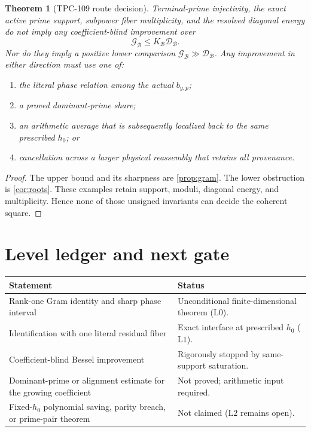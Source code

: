 \documentclass[11pt,a4paper]{article}
\newtheorem{theorem}{Theorem}[section]
\theoremstyle{definition}
\theoremstyle{remark}
\newcommand{\Lzero}{\mathrm{L0}}
\newcommand{\Lone}{\mathrm{L1}}
\newcommand{\Ltwo}{\mathrm{L2}}
\newcommand{\cD}{\mathcal D}
\newcommand{\cG}{\mathcal G}
\newcommand{\cB}{\mathcal B}
\begin{document}
\begin{theorem}[TPC-109 route decision]
\label{thm:decision}
Terminal-prime injectivity, the exact active prime support,
subpower fiber multiplicity, and the resolved diagonal energy do not
imply any coefficient-blind improvement over
\[
 \cG_{\cB}\le K_{\cB}\cD_{\cB}.
\]
Nor do they imply a positive lower comparison
\(\cG_{\cB}\gg\cD_{\cB}\).
Any improvement in either direction must use one of:
\begin{enumerate}[label=(\roman*),leftmargin=2.2em]
\item the literal phase relation among the actual \(b_{y,p}\);
\item a proved dominant-prime share;
\item an arithmetic average that is subsequently localized back to
the same prescribed \(h_0\); or
\item cancellation across a larger physical reassembly that retains
all provenance.
\end{enumerate}
\end{theorem}

\begin{proof}
The upper bound and its sharpness are
\cref{prop:gram}.  The lower obstruction is
\cref{cor:roots}.  These examples retain support, moduli, diagonal
energy, and multiplicity.  Hence none of those unsigned invariants
can decide the coherent square.
\end{proof}

\section{Level ledger and next gate}

\begin{center}
\small
\begin{tabularx}{\textwidth}{@{}p{}X@{}}
\toprule
Statement & Status\\
\midrule
Rank-one Gram identity and sharp phase interval
& Unconditional finite-dimensional theorem (\(\Lzero\)).\\
Identification with one literal residual fiber
& Exact interface at prescribed \(h_0\) (\(\Lone\)).\\
Coefficient-blind Bessel improvement
& Rigorously stopped by same-support saturation.\\
Dominant-prime or alignment estimate for the growing coefficient
& Not proved; arithmetic input required.\\
Fixed-\(h_0\) polynomial saving, parity breach, or prime-pair theorem
& Not claimed (\(\Ltwo\) remains open).\\
\bottomrule
\end{tabularx}
\end{center}
\end{document}
